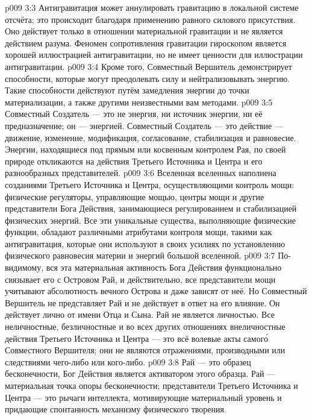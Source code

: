 \vs p009 3:3 \pc Антигравитация может аннулировать гравитацию в локальной системе отсчёта; это происходит благодаря применению равного силового присутствия. Оно действует только в отношении материальной гравитации и не является действием разума. Феномен сопротивления гравитации гироскопом является хорошей иллюстрацией  антигравитации, но не имеет ценности для иллюстрации  антигравитации.
\vs p009 3:4 Кроме того, Совместный Вершитель демонстрирует способности, которые могут преодолевать силу и нейтрализовывать энергию. Такие способности действуют путём замедления энергии до точки материализации, а также другими неизвестными вам методами.
\vs p009 3:5 \pc Совместный Создатель --- это не энергия, ни источник энергии, ни её предназначение; он ---  энергией. Совместный Создатель --- это действие --- движение, изменение, модификация, согласование, стабилизация и равновесие. Энергии, находящиеся под прямым или косвенным контролем Рая, по своей природе откликаются на действия Третьего Источника и Центра и его разнообразных представителей.
\vs p009 3:6 Вселенная вселенных наполнена созданиями Третьего Источника и Центра, осуществляющими контроль мощи: физические регуляторы, управляющие мощью, центры мощи и другие представители Бога Действия, занимающиеся регулированием и стабилизацией физических энергий. Все эти уникальные существа, выполняющие физические функции, обладают различными атрибутами контроля мощи, такими как антигравитация, которые они используют в своих усилиях по установлению физического равновесия материи и энергий большой вселенной.
\vs p009 3:7 По\hyp{}видимому, вся эта материальная активность Бога Действия функционально связывает его с Островом Рай, и действительно, все представители мощи учитывают абсолютность вечного Острова и даже зависят от неё. Но Совместный Вершитель не представляет Рай и не действует в ответ на его влияние. Он действует лично от имени Отца и Сына. Рай не является личностью. Все неличностные, безличностные и во всех других отношениях внеличностные действия Третьего Источника и Центра --- это всё волевые акты самог\'о Совместного Вершителя; они не являются отражениями, производными или следствиями чего\hyp{}либо или кого\hyp{}либо.
\vs p009 3:8 Рай --- это образец бесконечности, Бог Действия является активатором этого образца. Рай --- материальная точка опоры бесконечности; представители Третьего Источника и Центра --- это рычаги интеллекта, мотивирующие материальный уровень и придающие спонтанность механизму физического творения.

